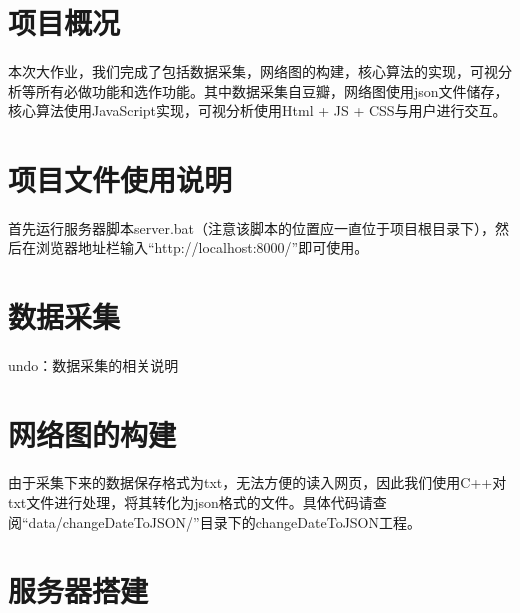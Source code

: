 \documentclass{article}
\begin{document}
\begin{CJK}{UTF8}{gkai}
\section{项目概况} %
	\paragraph{}
	本次大作业，我们完成了包括数据采集，网络图的构建，核心算法的实现，可视分析等所有必做功能和选作功能。其中数据采集自豆瓣，网络图使用json文件储存，核心算法使用JavaScript实现，可视分析使用Html + JS + CSS与用户进行交互。

\section{项目文件使用说明} %
	\paragraph{}
	首先运行服务器脚本server.bat（注意该脚本的位置应一直位于项目根目录下），然后在浏览器地址栏输入“http://localhost:8000/”即可使用。

\section{数据采集} %
	\paragraph{}
	undo：数据采集的相关说明

\section{网络图的构建} %
	\paragraph{}
	由于采集下来的数据保存格式为txt，无法方便的读入网页，因此我们使用C++对txt文件进行处理，将其转化为json格式的文件。具体代码请查阅“data/changeDateToJSON/”目录下的changeDateToJSON工程。

\section{服务器搭建} %

\end{CJK}
\end{document}
